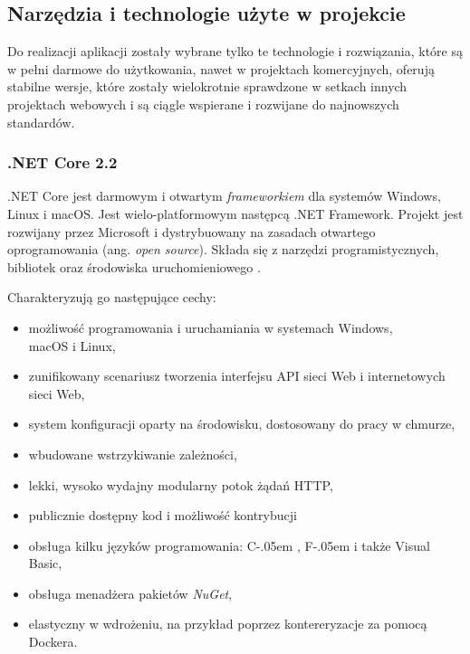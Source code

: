 \documentclass[12pt]{article}
\newcommand{\Csharp}{%
  {\settoheight{\dimen0}{C}C\kern-.05em \resizebox{!}{\dimen0}{\raisebox{\depth}{\# }}}}
\newcommand{\Fsharp}{%
  {\settoheight{\dimen0}{F}F\kern-.05em \resizebox{!}{\dimen0}{\raisebox{\depth}{\# }}}}
\numberwithin{figure}{section}
\begin{document}
\begin{sloppypar}
\subsection{Narzędzia i technologie użyte w projekcie}
Do realizacji aplikacji zostały wybrane tylko te technologie i rozwiązania, które są w pełni darmowe do użytkowania, nawet w projektach komercyjnych, oferują stabilne wersje, które zostały wielokrotnie sprawdzone w setkach innych projektach webowych i są ciągle wspierane i rozwijane do najnowszych standardów. 

\subsubsection{.NET Core 2.2}
.NET Core jest darmowym i otwartym \textit{frameworkiem} dla systemów Windows, Linux i macOS. Jest wielo-platformowym następcą .NET Framework. Projekt jest rozwijany przez Microsoft i dystrybuowany na zasadach otwartego oprogramowania (ang. \textit{open source}). Składa się z narzędzi programistycznych, bibliotek oraz środowiska uruchomieniowego \cite{dotnet-core}. 
    
Charakteryzują go następujące cechy:
\begin{itemize}
    \item możliwość programowania i uruchamiania w systemach Windows,\\ macOS i Linux,
    \item zunifikowany scenariusz tworzenia interfejsu API sieci Web i internetowych sieci Web,
    \item system konfiguracji oparty na środowisku, dostosowany do pracy w chmurze,
    \item wbudowane wstrzykiwanie zależności,
    \item lekki, wysoko wydajny modularny potok żądań HTTP,
    \item publicznie dostępny kod i możliwość kontrybucji
    \item obsługa kilku języków programowania: \Csharp, \Fsharp i także Visual Basic,
    \item obsługa menadżera pakietów \textit{NuGet},
    \item elastyczny w wdrożeniu, na przykład poprzez kontereryzacje za pomocą Dockera.
\end{itemize}

\end{sloppypar}
\end{document}
